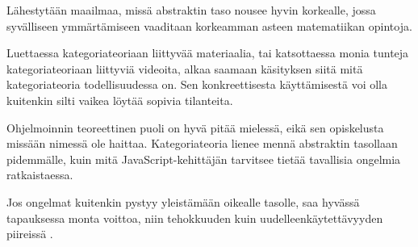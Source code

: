 



Lähestytään maailmaa, missä abstraktin taso nousee hyvin korkealle, jossa syvälliseen ymmärtämiseen vaaditaan korkeamman asteen matematiikan opintoja.

Luettaessa kategoriateoriaan liittyvää materiaalia, tai katsottaessa monia tunteja kategoriateoriaan liittyviä videoita, alkaa saamaan käsityksen siitä mitä kategoriateoria todellisuudessa on. Sen konkreettisesta käyttämisestä voi olla kuitenkin silti vaikea löytää sopivia tilanteita.

Ohjelmoinnin teoreettinen puoli on hyvä pitää mielessä, eikä sen opiskelusta missään nimessä ole haittaa. Kategoriateoria lienee mennä abstraktin tasollaan pidemmälle, kuin mitä JavaScript-kehittäjän tarvitsee tietää tavallisia ongelmia ratkaistaessa.

Jos ongelmat kuitenkin pystyy yleistämään oikealle tasolle, saa hyvässä tapauksessa monta voittoa, niin tehokkuuden kuin uudelleenkäytettävyyden piireissä \cite{clojure_compiler,bartosz_category_for_progamers}.





